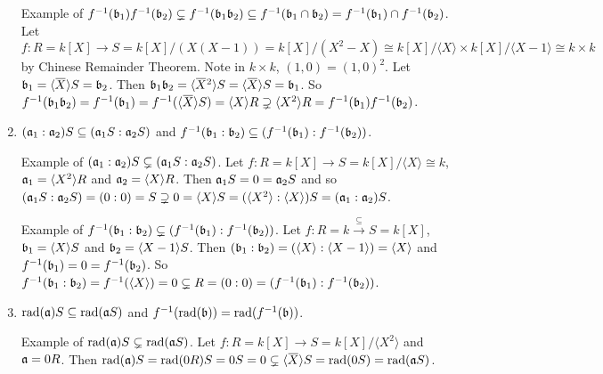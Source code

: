 \begin{proposition}
\begin{enumerate}
            Example of $f^{-1}(\mathfrak{b}_1)f^{-1}(\mathfrak{b}_2) \subsetneq f^{-1}(\mathfrak{b}_1\mathfrak{b}_2) \subseteq f^{-1}(\mathfrak{b}_1 \cap \mathfrak{b}_2) = f^{-1}(\mathfrak{b}_1) \cap f^{-1}(\mathfrak{b}_2)$. Let $f: R = k[X] \to S = k[X]/(X(X-1)) = k[X]/(X^2-X) \cong k[X]/\langle X \rangle \times k[X]/\langle X-1 \rangle \cong k \times k$ by Chinese Remainder Theorem. Note in $k \times k$, $(1,0) = (1,0)^2$. Let $\ffb_1 = \langle \overbar X \rangle S = \ffb_2$. Then $\ffb_1 \ffb_2 = \langle \overbar X^2 \rangle S = \langle \overbar X \rangle S = \ffb_1$. So $f^{-1}(\ffb_1 \ffb_2) = f^{-1}(\ffb_1)  =  f^{-1}(\langle \overbar X \rangle S) = \langle X \rangle R \supsetneq \langle X^2 \rangle R = f^{-1}(\ffb_1)f^{-1}(\ffb_2)$.
        \item $(\mathfrak{a}_1:\mathfrak{a}_2)S \subseteq (\mathfrak{a}_1S:\mathfrak{a}_2S)$ and $f^{-1}(\mathfrak{b}_1:\mathfrak{b}_2) \subseteq (f^{-1}(\mathfrak{b}_1):f^{-1}(\mathfrak{b}_2))$. \par
            Example of $(\mathfrak{a}_1:\mathfrak{a}_2)S \subsetneq (\mathfrak{a}_1S : \mathfrak{a}_2 S)$. Let $f: R = k[X] \to S = k[X]/\langle X \rangle \cong k$, $\mathfrak{a}_1 = \langle X^2 \rangle R$ and $\mathfrak{a}_2 = \langle X \rangle R$. Then $\mathfrak{a}_1 S = 0 = \mathfrak{a}_2 S$ and so $(\mathfrak{a}_1 S: \mathfrak{a}_2 S) = (0:0) = S \supsetneq 0 = \langle X \rangle S = (\langle X^2 \rangle: \langle X \rangle)S = (\mathfrak{a}_1:\mathfrak{a}_2)S$. \par
            Example of $f^{-1}(\mathfrak{b}_1:\mathfrak{b}_2) \subsetneq (f^{-1}(\mathfrak{b}_1):f^{-1}(\mathfrak{b}_2))$. Let $f: R = k \xrightarrow {\subseteq} S = k[X]$, $\mathfrak{b}_1 = \langle X \rangle S$ and $\mathfrak{b}_2 = \langle X-1 \rangle S$. Then $(\mathfrak{b}_1:\mathfrak{b}_2) = (\langle X \rangle: \langle X-1 \rangle) = \langle X \rangle$ and $f^{-1}(\mathfrak{b}_1) = 0 = f^{-1}(\mathfrak{b}_2)$. So $f^{-1}(\mathfrak{b}_1:\mathfrak{b}_2) = f^{-1}(\langle X \rangle) = 0 \subsetneq R = (0:0) = (f^{-1}(\mathfrak{b}_1):f^{-1}(\mathfrak{b}_2))$. 
        \item $\operatorname{rad}(\mathfrak{a})S \subseteq \operatorname{rad}(\mathfrak{a} S)$ and $f^{-1}(\operatorname{rad}(\mathfrak{b})) = \operatorname{rad}(f^{-1}(\mathfrak{b}))$. \par
            Example of $\operatorname{rad}(\mathfrak{a}) S \subsetneq \operatorname{rad}(\mathfrak{a} S)$. Let $f: R = k[X] \to S = k[X]/\langle X^2 \rangle$ and $\mathfrak{a} = 0R$. Then $\operatorname{rad}(\ffa)S = \operatorname{rad}(0R)S = 0S = 0 \subsetneq \langle \overbar X \rangle S = \operatorname{rad}(0S) = \operatorname{rad}(\ffa S)$.
    \end{enumerate}
\end{proposition}

